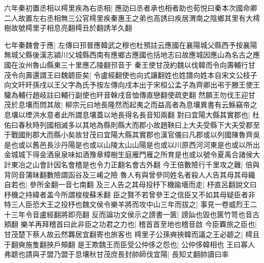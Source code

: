 六年秦初置丞相以樗里疾為右丞相|{
	應劭曰丞者承也相者助也荀悦曰秦本次國命卿二人故置左右丞相無三公官樗里疾秦惠王之弟也高誘曰疾居渭南之陰鄉其里有大樗樹故號樗里子相息亮翻樗丑於翻誘羊久翻}


七年秦魏會于應|{
	左傳曰邘晉應韓武之穆也杜預註云應國在襄陽城父縣西予按襄陽無城父縣後漢志潁川父城縣西南有應鄉古應國也括地志曰故應城因應山為名古之應國在汝州魯山縣東三十里應乙陵翻邘音于}
秦王使甘茂約魏以伐韓而令向壽輔行甘茂令向壽還謂王曰魏聼臣矣|{
	令盧經翻使也向式讓翻姓也姓譜向姓本自宋文公枝子向文旰旰孫戌以王父字為氏予按左傳向戌本出于宋桓公孟子為齊卿出弔于滕王使王驩為輔行趙岐註曰輔行副使也旰音榦戌音恤傳直戀翻使疏吏翻}
然願王勿伐王迎甘茂於息壤而問其故|{
	柳宗元曰地長隆然而起夷之而益高者為息壤異書有云鯀竊帝之息壤以堙洪水意者此所謂息壤蓋以地長得名長音知兩翻}
對曰宜陽大縣其實郡也|{
	杜佑曰春秋時列國相滅多以其地為縣則縣大而郡小故趙鞅曰上大夫受縣下大夫受郡至于戰國則郡大而縣小矣故甘茂曰宜陽大縣其實郡也漢官儀曰凡郡或以列國陳魯齊吳是也或以舊邑長沙丹陽是也或以山陵太山山陽是也或以川原西河河東是也或以所出金城城下得金酒泉泉味如酒豫章樟樹生庭雁門雁之所育是也或以號令夏禹合諸侯大計東冶之山會計因名會稽是也令力正翻名會古外翻}
今王倍數險行千里攻之難|{
	倍與背同音蒲昧翻數險謂函谷及三崤之險}
魯人有與曾參同姓名者殺人人告其母其母織自若也|{
	參所金翻一音七南翻}
及三人告之其母投杼下機踰墻而走|{
	杼直呂翻說文曰杼機之持緯者盖今所謂梭梭蘇禾翻}
臣之賢不若曾參王之信臣又不如其母疑臣者非特三人臣恐大王之投杼也魏文侯令樂羊將而攻中山三年而拔之|{
	事見一卷威烈王二十三年令音盧經翻將即亮翻}
反而論功文侯示之謗書一篋|{
	謗訕也毀也篋竹笥也音古頬翻}
樂羊再拜稽首曰此非臣之功君之力也|{
	稽首首至地也稽音啟}
今臣覉旅之臣也|{
	甘茂楚下蔡人故云然覉居宜翻寄也旅客也}
樗里子公孫奭挾韓而議之王必聼之|{
	樗且于翻奭施隻翻挾戶頰翻}
是王欺魏王而臣受公仲侈之怨也|{
	公仲侈韓相也}
王曰寡人弗聼也請與子盟乃盟于息壤秋甘茂庶長封帥師伐宜陽|{
	長知丈翻帥讀曰率}


